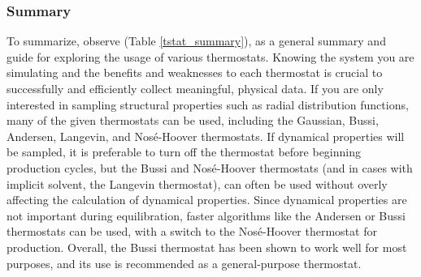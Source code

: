 \documentclass[9pt,bestpractices]{livecoms}
\begin{document}
\subsubsection{Summary}
To summarize, observe (Table \ref{tstat_summary}), as a general summary and guide for exploring the usage of various thermostats.
Knowing the system you are simulating and the benefits and weaknesses to each thermostat is crucial to successfully and efficiently collect meaningful, physical data.
If you are only interested in sampling structural properties such as radial distribution functions, many of the given thermostats can be used, including the Gaussian, Bussi, Andersen, Langevin, and Nos\'{e}-Hoover thermostats.
If dynamical properties will be sampled, it is preferable to turn off the thermostat before beginning production cycles, but the Bussi and Nos\'{e}-Hoover thermostats (and in cases with implicit solvent, the Langevin thermostat), can often be used without overly affecting the calculation of dynamical properties.
Since dynamical properties are not important during equilibration, faster algorithms like the Andersen or Bussi thermostats can be used, with a switch to the Nos\'{e}-Hoover thermostat for production.
Overall, the Bussi thermostat has been shown to work well for most purposes, and its use is recommended as a general-purpose thermostat.
\end{document}
